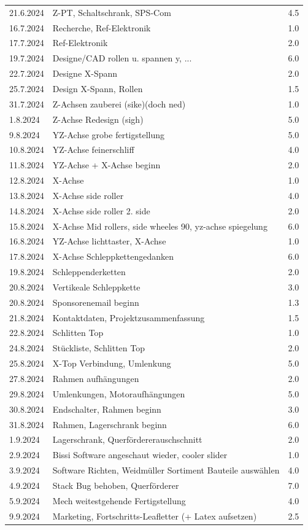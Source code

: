 \begin{longtable}{|l|p{10cm}|r|}
21.6.2024	&Z-PT, Schaltschrank, SPS-Com&	4.5\\
16.7.2024	&Recherche, Ref-Elektronik&	1.0\\
17.7.2024	&Ref-Elektronik	&2.0\\
19.7.2024	&Designe/CAD rollen u. spannen y, ...	&6.0\\
22.7.2024	&Designe X-Spann	&2.0\\
25.7.2024	&Design X-Spann, Rollen	&1.5\\
31.7.2024	&Z-Achsen zauberei (sike)(doch ned)&	1.0\\
1.8.2024	&Z-Achse Redesign (sigh)	&5.0\\
9.8.2024	&YZ-Achse grobe fertigstellung&	5.0\\
10.8.2024	&YZ-Achse feinerschliff	&4.0\\
11.8.2024	&YZ-Achse + X-Achse beginn&	2.0\\
12.8.2024	&X-Achse	&1.0\\
13.8.2024	&X-Achse side roller	&4.0\\
14.8.2024	&X-Achse side roller 2. side	&2.0\\
15.8.2024	&X-Achse Mid rollers, side wheeles 90, yz-achse spiegelung	&6.0\\
16.8.2024	&YZ-Achse lichttaster, X-Achse	&1.0\\
17.8.2024	&X-Achse Schleppkettengedanken 	&6.0\\
19.8.2024	&Schleppenderketten	&2.0\\
20.8.2024	&Vertikeale Schleppkette	&3.0\\
20.8.2024	&Sponsorenemail beginn	&1.3\\
21.8.2024	&Kontaktdaten, Projektzusammenfassung	&1.5\\
22.8.2024	&Schlitten Top	&1.0\\
24.8.2024	&Stückliste, Schlitten Top	&2.0\\
25.8.2024	&X-Top Verbindung, Umlenkung	&5.0\\
27.8.2024	&Rahmen aufhängungen	&2.0\\
29.8.2024	&Umlenkungen, Motoraufhängungen	&5.0\\
30.8.2024	&Endschalter, Rahmen beginn	&3.0\\
31.8.2024	&Rahmen, Lagerschrank beginn	&6.0\\
1.9.2024	&Lagerschrank, Querfördererauschschnitt	&2.0\\
2.9.2024	&Bissi Software angeschaut wieder, cooler slider	&1.0\\
3.9.2024	&Software Richten, Weidmüller Sortiment Bauteile auswählen	&4.0\\
4.9.2024	&Stack Bug behoben, Querförderer	&7.0\\
5.9.2024	&Mech weitestgehende Fertigstellung	&4.0\\
9.9.2024	&Marketing, Fortschritts-Leafletter (+ Latex aufsetzen)	&2.5\\


\end{longtable}
